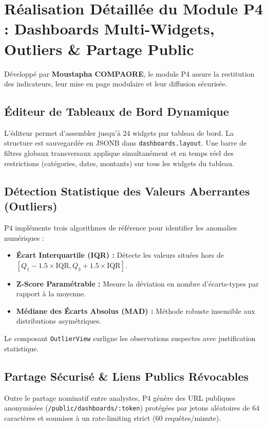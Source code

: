 \documentclass[11pt,a4paper]{article}
\begin{document}
\section{Réalisation Détaillée du Module P4 : Dashboards Multi-Widgets, Outliers \& Partage Public}

Développé par \textbf{Moustapha COMPAORE}, le module P4 assure la restitution des indicateurs, leur mise en page modulaire et leur diffusion sécurisée.

\subsection{Éditeur de Tableaux de Bord Dynamique}
L'éditeur permet d'assembler jusqu'à 24 widgets par tableau de bord. La structure est sauvegardée en JSONB dans \texttt{dashboards.layout}. Une barre de filtres globaux transversaux applique simultanément et en temps réel des restrictions (catégories, dates, montants) sur tous les widgets du tableau.

\subsection{Détection Statistique des Valeurs Aberrantes (Outliers)}
P4 implémente trois algorithmes de référence pour identifier les anomalies numériques :
\begin{itemize}[leftmargin=1.5cm, label=\textcolor{techblue}{\textbullet}]
    \item \textbf{Écart Interquartile (IQR) :} Détecte les valeurs situées hors de $[Q_1 - 1.5\times\text{IQR}, Q_3 + 1.5\times\text{IQR}]$.
    \item \textbf{Z-Score Paramétrable :} Mesure la déviation en nombre d'écarts-types par rapport à la moyenne.
    \item \textbf{Médiane des Écarts Absolus (MAD) :} Méthode robuste insensible aux distributions asymétriques.
\end{itemize}
Le composant \texttt{OutlierView} surligne les observations suspectes avec justification statistique.

\subsection{Partage Sécurisé \& Liens Publics Révocables}
Outre le partage nominatif entre analystes, P4 génère des URL publiques anonymisées (\texttt{/public/dashboards/:token}) protégées par jetons aléatoires de 64 caractères et soumises à un rate-limiting strict (60 requêtes/minute).
\end{document}
